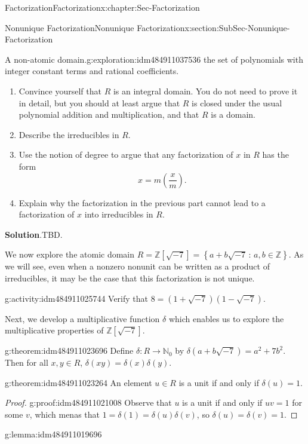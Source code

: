 \documentclass[oneside,10pt,]{book}
\newcommand{\blocktitlefont}{\relax}
\numberwithin{equation}{section}
\newcommand{\setof}[2]{{\left\{#1\,\colon\,#2\right\}}}
\def\Z{{\mathbb Z}}
\def\N{{\mathbb N}}
\begin{document}
\begin{chapterptx}{Factorization}{}{Factorization}{}{}{x:chapter:Sec-Factorization}
\begin{sectionptx}{Nonunique Factorization}{}{Nonunique Factorization}{}{}{x:section:SubSec-Nonunique-Factorization}
\begin{exploration}{A non-atomic domain.}{g:exploration:idm484911037536}
the set of polynomials with integer constant terms and rational coefficients.%
%
\begin{enumerate}
\item{}Convince yourself that \(R\) is an integral domain. You do not need to prove it in detail, but you should at least argue that \(R\) is closed under the usual polynomial addition and multiplication, and that \(R\) is a domain.%
\item{}Describe the irreducibles in \(R\).%
\item{}Use the notion of degree to argue that any factorization of \(x\) in \(R\) has the form%
\begin{equation*}
x = m\left(\frac{x}{m}\right).
\end{equation*}
%
\item{}Explain why the factorization in the previous part cannot lead to a factorization of \(x\) into irreducibles in \(R\).%
\end{enumerate}
\par\smallskip%
\noindent\textbf{\blocktitlefont Solution}.\hypertarget{g:solution:idm484911026816}{}\quad{}TBD.\end{exploration}
We now explore the atomic domain \(R = \Z[\sqrt{-7}] = \setof{a+b\sqrt{-7}}{a,b\in\Z}\). As we will see, even when a nonzero nonunit can be written as a product of irreducibles, it may be the case that this factorization is not unique.%
\begin{activity}{}{g:activity:idm484911025744}%
Verify that \(8 = (1+\sqrt{-7})(1-\sqrt{-7})\).%
\end{activity}
Next, we develop a multiplicative function \(\delta\) which enables us to explore the multiplicative properties of \(\Z[\sqrt{-7}]\).%
\begin{theorem}{}{}{g:theorem:idm484911023696}%
Define \(\delta : R \to \N_0\) by \(\delta(a+b\sqrt{-7}) = a^2 + 7 b^2\). Then for all \(x,y\in R\), \(\delta(xy) = \delta(x)\delta(y)\).%
\end{theorem}
\begin{theorem}{}{}{g:theorem:idm484911023264}%
An element \(u\in R\) is a unit if and only if \(\delta(u) = 1\).%
\end{theorem}
\begin{proof}{}{g:proof:idm484911021008}
Observe that \(u\) is a unit if and only if \(uv = 1\) for some \(v\), which menas that \(1 = \delta(1) = \delta(u) \delta(v)\), so \(\delta(u) = \delta(v) = 1\).%
\end{proof}
\begin{lemma}{}{}{g:lemma:idm484911019696}%

\end{lemma}
\end{sectionptx}
\end{chapterptx}
\end{document}
